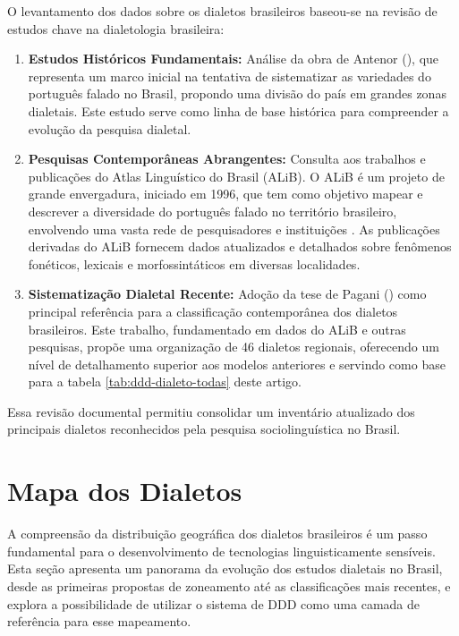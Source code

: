 O levantamento dos dados sobre os dialetos brasileiros baseou-se na revisão de estudos chave na dialetologia brasileira:
\begin{enumerate}
    \item \textbf{Estudos Históricos Fundamentais:} Análise da obra de Antenor (\citeyear{nascentes1953}), que representa um marco inicial na tentativa de sistematizar as variedades do português falado no Brasil, propondo uma divisão do país em grandes zonas dialetais. Este estudo serve como linha de base histórica para compreender a evolução da pesquisa dialetal.
    \item \textbf{Pesquisas Contemporâneas Abrangentes:} Consulta aos trabalhos e publicações do Atlas Linguístico do Brasil (ALiB). O ALiB é um projeto de grande envergadura, iniciado em 1996, que tem como objetivo mapear e descrever a diversidade do português falado no território brasileiro, envolvendo uma vasta rede de pesquisadores e instituições \cite{cardoso2014alib, Aguilera2022}. As publicações derivadas do ALiB fornecem dados atualizados e detalhados sobre fenômenos fonéticos, lexicais e morfossintáticos em diversas localidades.
    \item \textbf{Sistematização Dialetal Recente:} Adoção da tese de Pagani (\citeyear{pagani2022}) como principal referência para a classificação contemporânea dos dialetos brasileiros. Este trabalho, fundamentado em dados do ALiB e outras pesquisas, propõe uma organização de 46 dialetos regionais, oferecendo um nível de detalhamento superior aos modelos anteriores e servindo como base para a tabela \ref{tab:ddd-dialeto-todas} deste artigo.
\end{enumerate}
Essa revisão documental permitiu consolidar um inventário atualizado dos principais dialetos reconhecidos pela pesquisa sociolinguística no Brasil.







\chapter{Mapa dos Dialetos}
A compreensão da distribuição geográfica dos dialetos brasileiros é um passo fundamental para o desenvolvimento de tecnologias linguisticamente sensíveis. Esta seção apresenta um panorama da evolução dos estudos dialetais no Brasil, desde as primeiras propostas de zoneamento até as classificações mais recentes, e explora a possibilidade de utilizar o sistema de DDD como uma camada de referência para esse mapeamento.

